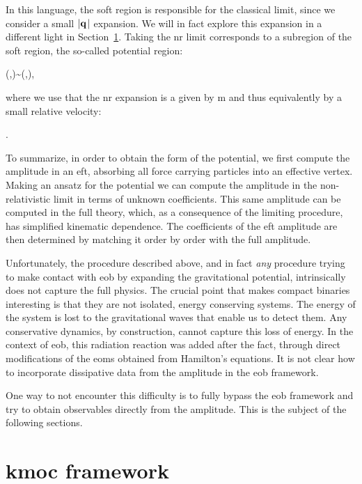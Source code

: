 \documentclass[
  11pt,
  a4paper,
  DIV=11,
  numbers=noendperiod,
  oneside]{scrreprt}
\let\[\relax \let\]\relax %
\DeclareRobustCommand{\[}{\begin{equation}}
\DeclareRobustCommand{\]}{\end{equation}}
\begin{document}
In this language, the soft region is responsible for the classical
limit, since we consider a small \(\vert\mathbf{{q_{}}}_{} \vert\) expansion. We will
in fact explore this expansion in a different light in
Section~\ref{sec-kmoc}. Taking the \gls{nr} limit corresponds to a
subregion of the soft region, the so-called potential region:

\[ (\omega,\tv{\ell})\sim (\abs{\tv{\vel}}\abs{\tv{\tm}},\abs{\tv{\tm}}),\]

where we use that the \gls{nr} expansion is a given by
\[\abs{\tv{\emom}}\ll m\] and thus equivalently  by a small relative velocity:

\[ \abs{\tv{\vel}}.\]

To summarize, in order to obtain the form of the potential, we first
compute the amplitude in an \gls{eft}, absorbing all force carrying
particles into an effective vertex. Making an ansatz for the potential
we can compute the amplitude in the non-relativistic limit in terms of
unknown coefficients. This same amplitude can be computed in the full
theory, which, as a consequence of the limiting procedure, has
simplified kinematic dependence. The coefficients of the \gls{eft}
amplitude are then determined by matching it order by order with the
full amplitude.

Unfortunately, the procedure described above, and in fact \emph{any}
procedure trying to make contact with \gls{eob} by expanding the
gravitational potential, intrinsically does not capture the full
physics. The crucial point that makes compact binaries interesting is
that they are not isolated, energy conserving systems. The energy of the
system is lost to the gravitational waves that enable us to detect them.
Any conservative dynamics, by construction, cannot capture this loss of
energy. In the context of \gls{eob}, this radiation reaction was added
after the fact, through direct modifications of the \gls{eom}s obtained
from Hamilton's equations. It is not clear how to incorporate
dissipative data from the amplitude in the \gls{eob} framework.

One way to not encounter this difficulty is to fully bypass the
\gls{eob} framework and try to obtain observables directly from the
amplitude. This is the subject of the following sections.

\hypertarget{sec-kmoc}{%
\section{\texorpdfstring{\acrshort{kmoc}
framework}{ framework}}\label{sec-kmoc}}
\end{document}
